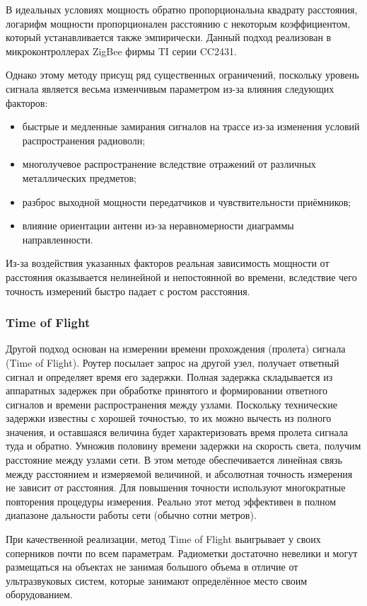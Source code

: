 В идеальных условиях мощность обратно пропорциональна квадрату расстояния, логарифм мощности пропорционален расстоянию с некоторым коэффициентом, который устанавливается также эмпирически. Данный подход реализован в микроконтроллерах ZigBee фирмы TI серии CC2431.

Однако этому методу присущ ряд существенных ограничений, поскольку уровень сигнала является весьма изменчивым параметром из-за влияния следующих факторов:

\begin{itemize}
    \item быстрые и медленные замирания сигналов на трассе из-за изменения условий распространения радиоволн;
    \item многолучевое распространение вследствие отражений от различных металлических предметов;
    \item разброс выходной мощности передатчиков и чувствительности приёмников;
    \item влияние ориентации антенн из-за неравномерности диаграммы направленности.
\end{itemize}

Из-за воздействия указанных факторов реальная зависимость мощности от расстояния оказывается нелинейной и непостоянной во времени, вследствие чего точность измерений быстро падает с ростом расстояния. 

\subsubsection{Time of Flight}

Другой подход основан на измерении времени прохождения (пролета) сигнала (Time of Flight). Роутер посылает запрос на другой узел, получает ответный сигнал и определяет время его задержки. Полная задержка складывается из аппаратных задержек при обработке принятого и формировании ответного сигналов и времени распространения между узлами. Поскольку технические задержки известны с хорошей точностью, то их можно вычесть из полного значения, и оставшаяся величина будет характеризовать время пролета сигнала туда и обратно. Умножив половину времени задержки на скорость света, получим расстояние между узлами сети. В этом методе обеспечивается линейная связь между расстоянием и измеряемой величиной, и абсолютная точность измерения не зависит от расстояния. Для повышения точности используют многократные повторения процедуры измерения. Реально этот метод эффективен в полном диапазоне дальности работы сети (обычно сотни метров).

При качественной реализации, метод Time of Flight выигрывает у своих соперников почти по всем параметрам. Радиометки достаточно невелики и могут размещаться на объектах не занимая большого объема в отличие от ультразвуковых систем, которые занимают определённое место своим оборудованием.
